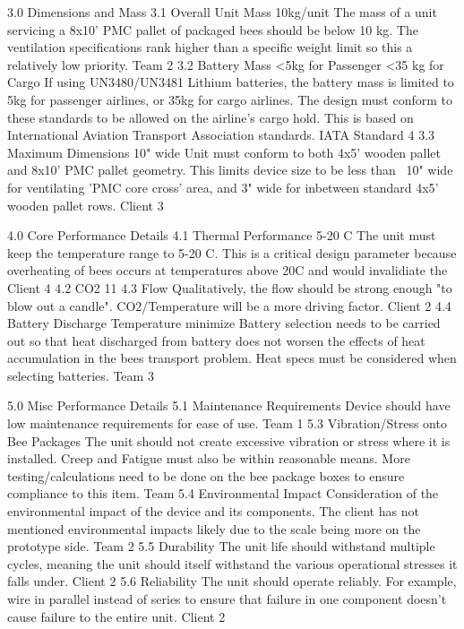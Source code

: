3.0	Dimensions and Mass	 	 	 	 
3.1	Overall Unit Mass	10kg/unit	The mass of a unit servicing a 8x10' PMC pallet of packaged bees should be below 10 kg. The ventilation specifications rank higher than a specific weight limit so this a relatively low priority.	Team	2
3.2	Battery Mass	<5kg for Passenger
<35 kg for Cargo	If using UN3480/UN3481 Lithium batteries, the battery mass is limited to 5kg for passenger airlines, or 35kg for cargo airlines. The design must conform to these standards to be allowed on the airline's cargo hold. This is based on  International Aviation Transport Association standards.	IATA Standard	4
3.3	Maximum Dimensions	10" wide	Unit must conform to both 4x5' wooden pallet and 8x10' PMC pallet geometry. This limits device size to be less than ~10" wide for ventilating 'PMC core cross' area, and 3" wide for inbetween standard 4x5' wooden pallet rows.	Client	3
					
4.0	Core Performance Details	 	 	 	 
4.1	Thermal Performance	5-20 C	The unit must keep the temperature range to 5-20 C. This is a critical design parameter because overheating of bees occurs at temperatures above 20C and would invalidiate the 	Client	4
4.2	CO2	11%
4.3	Flow		Qualitatively, the flow should be strong enough "to blow out a candle". CO2/Temperature will be a more driving factor.	Client	2
4.4	Battery Discharge Temperature	minimize	Battery selection needs to be carried out so that heat discharged from battery does not worsen the effects of heat accumulation in the bees transport problem. Heat specs must be considered when selecting batteries.	Team	3
					
5.0	Misc Performance Details	 	 	 	 
5.1	Maintenance Requirements 		Device should have low maintenance requirements for ease of use.	Team	1
5.3	Vibration/Stress onto Bee Packages		The unit should not create excessive vibration or stress where it is installed. Creep and Fatigue must also be within reasonable means. More testing/calculations need to be done on the bee package boxes to ensure compliance to this item.	Team	
5.4	Environmental Impact		Consideration of the environmental impact of the device and its components. The client has not mentioned environmental impacts likely due to the scale being more on the prototype side.	Team	2
5.5	Durability		The unit life should withstand multiple cycles, meaning the unit should itself withstand the various operational stresses it falls under.	Client	2
5.6	Reliability		The unit should operate reliably. 
For example, wire in parallel instead of series to ensure that failure in one component doesn't cause failure to the entire unit.	Client	2
					
